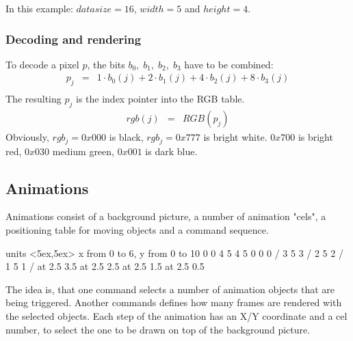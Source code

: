 \documentclass[11pt,twoside,openright]{report}
\begin{document}
In this example: $datasize=16$, $width=5$ and $height=4$.\\
\subsubsection{Decoding and rendering}
To decode a pixel $p$, the bits $b_0,\;b_1,\;b_2,\;b_3$ have to be combined:\\
\begin{eqnarray*}
p_j&=&1\cdot b_0(j)+2\cdot b_1(j)+4\cdot b_2(j)+8\cdot b_3(j)\\
\end{eqnarray*}
The resulting $p_j$ is the index pointer into the RGB table.\\
\begin{eqnarray*}
rgb(j)&=&RGB(p_j)
\end{eqnarray*}
Obviously, $rgb_j=0x000$ is black, $rgb_j=0x777$ is bright white. $0x700$ is bright red, $0x030$ medium green, $0x001$ is dark blue.\\


\subsection{Animations}
Animations consist of a background picture, a number of animation "cels", a positioning table for moving objects and a command sequence.

\beginpicture
\setcoordinatesystem units <5ex,5ex>
\setplotarea x from 0 to 6, y from 0 to 10
 0 0 4 5 4 5 0 0 0 /
 3 5 3 /
 2 5 2 /
 1 5 1 /
 at 2.5 3.5
 at 2.5 2.5
 at 2.5 1.5
 at 2.5 0.5
\endpicture

The idea is, that one command selects a number of animation objects that are being triggered. Another commands defines how many frames are rendered with the selected objects. Each step of the animation has an X/Y coordinate and a cel number, to select the one to be drawn on top of the background picture.
\end{document}
